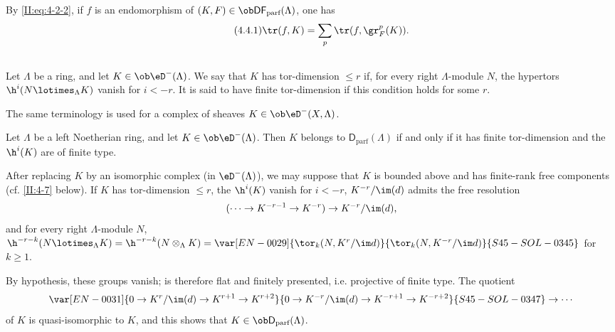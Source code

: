 By \eqref{II:eq:4-2-2}, if $f$ is an endomorphism of
$(K,F)\in\ob\mathsf{DF}_\text{parf}(\Lambda)$, one has
\begin{equation*}\tag{4.4.1}\label{II:eq:4-4-1}
 \tr(f,K) = \sum_p \tr(f,\gr_F^p(K)) \text{.}
\end{equation*}






\subsection{}\label{II:4-5}

Let $\Lambda$ be a ring, and let $K\in\ob\eD^-(\Lambda)$. We say that $K$
has tor-dimension $\leqslant r$ if, for every right $\Lambda$-module $N$, the
hypertors $\h^i(N\lotimes_\Lambda K)$ vanish for $i<-r$. It is said to have
finite tor-dimension if this condition holds for some $r$.

The same terminology is used for a complex of sheaves
$K\in\ob\eD^-(X,\Lambda)$.






\begin{lemma}\label{II:4-5-1}
Let $\Lambda$ be a left Noetherian ring, and let
$K\in\ob\eD^-(\Lambda)$. Then $K$ belongs to
$\mathsf{D}_\text{parf}(\Lambda)$ if and only if it has finite tor-dimension
and the $\h^i(K)$ are of finite type.
\end{lemma}

After replacing $K$ by an isomorphic complex (in $\eD^-(\Lambda)$), we may
suppose that $K$ is bounded above and has finite-rank free components (cf.
\ref{II:4-7} below). If $K$ has tor-dimension $\leqslant r$, the
$\h^i(K)$ vanish for $i<-r$, $K^{-r}/\im(d)$ admits the free resolution
\[
  (\cdots \to K^{-r-1} \to K^{-r}) \to K^{-r}/\im(d) \text{,}
\]
and for every right $\Lambda$-module $N$,
$\h^{-r-k}(N\lotimes_\Lambda K) = \h^{-r-k}(N\otimes_\Lambda K)
= \var[EN-0029]{\tor_k(N,K^r/\im d)}{\tor_k(N,K^{-r}/\im d)}{S45-SOL-0345}$ for $k\geqslant 1$.

By hypothesis, these groups vanish;  is therefore
flat and finitely presented, i.e. projective of finite type. The quotient
\[
  \var[EN-0031]{0 \to K^r/\im(d) \to K^{r+1} \to K^{r+2}}{0 \to K^{-r}/\im(d) \to K^{-r+1} \to K^{-r+2}}{S45-SOL-0347}\to \cdots
\]
of $K$ is quasi-isomorphic to $K$, and this shows that
$K\in\ob\mathsf{D}_\text{parf}(\Lambda)$.






